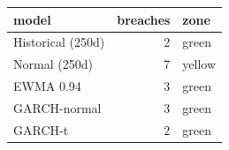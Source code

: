 
\begin{tabular}{lrl}
\toprule
model & breaches & zone\\
\midrule
Historical (250d) & 2 & green\\
Normal (250d) & 7 & yellow\\
EWMA 0.94 & 3 & green\\
GARCH-normal & 3 & green\\
GARCH-t & 2 & green\\
\bottomrule
\end{tabular}
